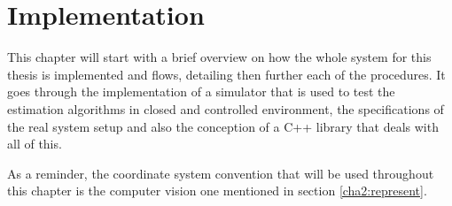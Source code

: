 
\chapter{Implementation}
\label{implementation}

This chapter will start with a brief overview on how the whole system for this thesis is implemented and flows, detailing then further each of the procedures. It goes through the implementation of a simulator that is used to test the estimation algorithms in closed and controlled environment, the specifications of the real system setup and also the conception of a C++ library that deals with all of this.

As a reminder, the coordinate system convention that will be used throughout this chapter is the computer vision one mentioned in section \ref{cha2:represent}. 

